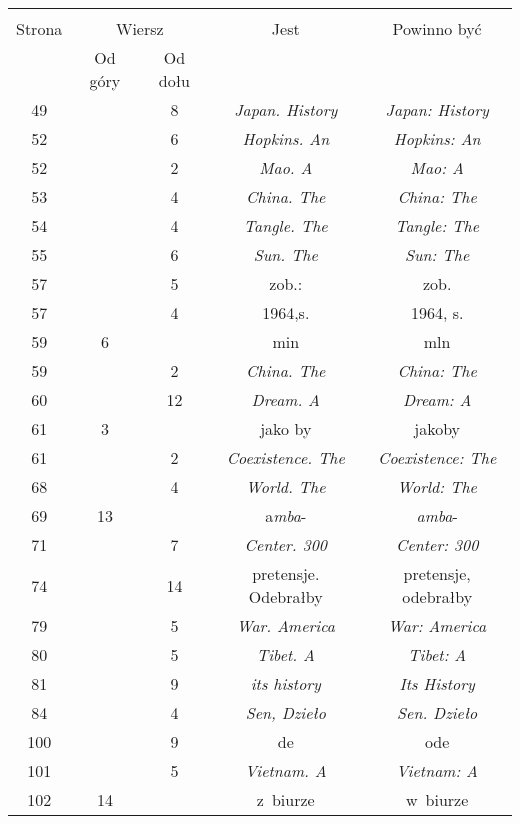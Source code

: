 \documentclass[a4paper,11pt]{article}
\begin{document}
\begin{center}
  \begin{tabular}{|c|c|c|c|c|}
    \hline
    & \multicolumn{2}{c|}{} & & \\
    Strona & \multicolumn{2}{c|}{Wiersz} & Jest
                              & Powinno być \\ \cline{2-3}
    & Od góry & Od dołu & & \\
    \hline
    49  & &  8 & \emph{Japan. History} & \emph{Japan: History} \\
    52  & &  6 & \emph{Hopkins. An} & \emph{Hopkins: An} \\
    52  & &  2 & \emph{Mao. A} & \emph{Mao: A} \\
    53  & &  4 & \emph{China. The} & \emph{China: The} \\
    54  & &  4 & \emph{Tangle. The} & \emph{Tangle: The} \\
    55  & &  6 & \emph{Sun. The} & \emph{Sun: The} \\
    57  & &  5 & zob.: & zob. \\
    57  & &  4 & 1964,s. & 1964, s. \\
    59  &  6 & & min & mln \\
    59  & &  2 & \emph{China. The} & \emph{China: The} \\
    60  & & 12 & \emph{Dream. A} & \emph{Dream: A} \\
    61  &  3 & & jako by & jakoby \\
    61  & &  2 & \emph{Coexistence. The} & \emph{Coexistence: The} \\
    68  & &  4 & \emph{World. The} & \emph{World: The} \\
    69  & 13 & & a\emph{mba}- & \emph{amba}- \\
    71  & &  7 & \emph{Center. 300} & \emph{Center: 300} \\
    74  & & 14 & pretensje. Odebrałby & pretensje, odebrałby \\
    79  & &  5 & \emph{War. America} & \emph{War: America} \\
    80  & &  5 & \emph{Tibet. A} & \emph{Tibet: A} \\
    81  & &  9 & \emph{its history} & \emph{Its History} \\
    84  & &  4 & \emph{Sen, Dzieło} & \emph{Sen. Dzieło} \\
    100 & &  9 & de & ode \\
    101 & &  5 & \emph{Vietnam. A} & \emph{Vietnam: A} \\
    102 & 14 & & z~biurze & w~biurze \\

\end{tabular}
\end{center}
\end{document}
